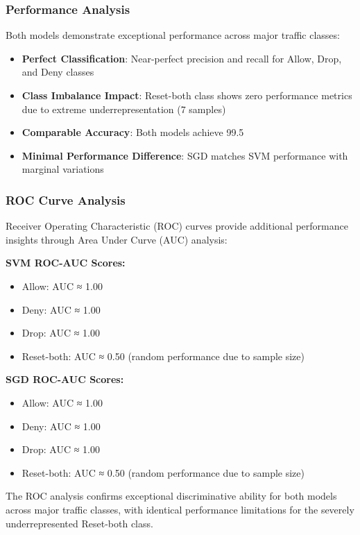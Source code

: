 \documentclass[12pt,a4paper]{article}
\begin{document}
\subsubsection{Performance Analysis}

Both models demonstrate exceptional performance across major traffic classes:

\begin{itemize}
    \item \textbf{Perfect Classification}: Near-perfect precision and recall for Allow, Drop, and Deny classes
    \item \textbf{Class Imbalance Impact}: Reset-both class shows zero performance metrics due to extreme underrepresentation (7 samples)
    \item \textbf{Comparable Accuracy}: Both models achieve 99.5%
    \item \textbf{Minimal Performance Difference}: SGD matches SVM performance with marginal variations
\end{itemize}

\subsubsection{ROC Curve Analysis}

Receiver Operating Characteristic (ROC) curves provide additional performance insights through Area Under Curve (AUC) analysis:

\textbf{SVM ROC-AUC Scores:}
\begin{itemize}
    \item Allow: AUC ≈ 1.00
    \item Deny: AUC ≈ 1.00  
    \item Drop: AUC ≈ 1.00
    \item Reset-both: AUC ≈ 0.50 (random performance due to sample size)
\end{itemize}

\textbf{SGD ROC-AUC Scores:}
\begin{itemize}
    \item Allow: AUC ≈ 1.00
    \item Deny: AUC ≈ 1.00
    \item Drop: AUC ≈ 1.00  
    \item Reset-both: AUC ≈ 0.50 (random performance due to sample size)
\end{itemize}

The ROC analysis confirms exceptional discriminative ability for both models across major traffic classes, with identical performance limitations for the severely underrepresented Reset-both class.
\end{document}
